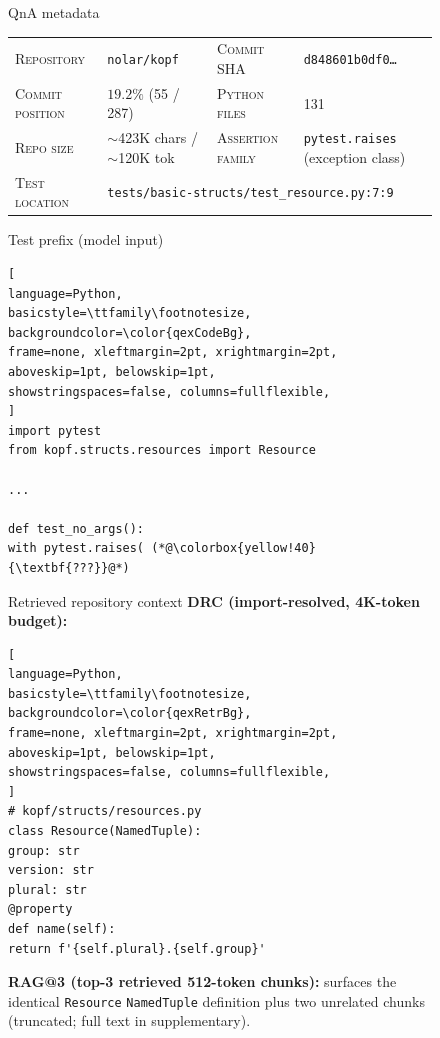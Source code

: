 \documentclass[11pt]{article}
\begin{document}
\begin{figure}[!htbp]
\begin{center}
\begin{tcolorbox}[
enhanced,
colback=white, colframe=qexHead, coltitle=white,
fonttitle=\bfseries,
title={Detailed qualitative example: \texttt{nolar/kopf} (Code2LoRA-exclusive, CR test, commit-derived)},
arc=3pt, boxrule=0.6pt,
top=3pt, bottom=3pt, left=6pt, right=6pt,
]

\begin{qexsection}{QnA metadata}
\footnotesize
\begin{tabular}{@{}l@{\;\;}l@{\hskip 14pt}l@{\;\;}l@{}}
\textsc{Repository}      & \texttt{nolar/kopf}                         & \textsc{Commit SHA}        & \texttt{d848601b0df0\ldots} \\
\textsc{Commit position} & $19.2\%$ (55 / 287)                         & \textsc{Python files}      & 131 \\
\textsc{Repo size}       & $\sim$423K chars / $\sim$120K tok           & \textsc{Assertion family}  & \texttt{pytest.raises} (exception class) \\
\textsc{Test location}   & \multicolumn{3}{l}{\texttt{tests/basic-structs/test\_resource.py:7:9}} \\
\end{tabular}
\end{qexsection}

\begin{qexsection}{Test prefix (model input)}
\begin{lstlisting}[
language=Python,
basicstyle=\ttfamily\footnotesize,
backgroundcolor=\color{qexCodeBg},
frame=none, xleftmargin=2pt, xrightmargin=2pt,
aboveskip=1pt, belowskip=1pt,
showstringspaces=false, columns=fullflexible,
]
import pytest
from kopf.structs.resources import Resource

...

def test_no_args():
with pytest.raises( (*@\colorbox{yellow!40}{\textbf{???}}@*)
\end{lstlisting}
\end{qexsection}

\begin{qexsection}{Retrieved repository context}
\textbf{\footnotesize DRC (import-resolved, 4K-token budget):}
\begin{lstlisting}[
language=Python,
basicstyle=\ttfamily\footnotesize,
backgroundcolor=\color{qexRetrBg},
frame=none, xleftmargin=2pt, xrightmargin=2pt,
aboveskip=1pt, belowskip=1pt,
showstringspaces=false, columns=fullflexible,
]
# kopf/structs/resources.py
class Resource(NamedTuple):
group: str
version: str
plural: str
@property
def name(self):
return f'{self.plural}.{self.group}'
\end{lstlisting}
\textbf{\footnotesize RAG@3 (top-3 retrieved 512-token chunks):} surfaces the identical \texttt{Resource} \texttt{NamedTuple} definition plus two unrelated chunks (truncated; full text in supplementary).
\end{qexsection}


\end{tcolorbox}
\end{center}
\end{figure}
\end{document}
